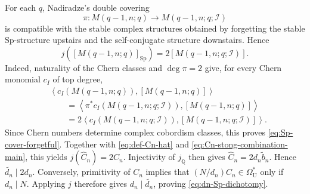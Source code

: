\documentclass[14pt,dvipsnames]{extarticle}
\makeatletter
\numberwithin{equation}{subsection}
\theoremstyle{plain}
\theoremstyle{definition}
\theoremstyle{definition}
\renewenvironment{proof}[1][\proofname]{
 \par\pushQED{\qed}\normalfont
 \topsep6\p@\@plus6\p@\relax
 \trivlist\item[\hskip\labelsep\bfseries\itshape #1\@addpunct{.}]
}{\popQED\endtrivlist\@endpefalse}
\newcommand{\OmU}{\Omega_{\mathrm U}^{\ast}}
\newcommand{\Sp}{\mathrm{Sp}}
\newcommand{\Ii}{\mathcal I}
\newcommand{\Q}{\mathbb{Q}}
\makeatother
\begin{document}
\begin{proof}[Proof of \cref{prop:sp-covering-numerator}]
For each $q$, Nadiradze's double covering \cite{Nad80}
\[
 \pi\colon M(q-1,n;q)\longrightarrow M(q-1,n;q;\Ii)
\]
is compatible with the stable complex structures obtained by forgetting the
stable $\Sp$-structure upstairs and the self-conjugate structure downstairs.
Hence
\begin{equation}\label{eq:Sp-cover-forgetful}
 j([M(q-1,n;q)]_{\Sp})
 =2[M(q-1,n;q;\Ii)].
\end{equation}
Indeed, naturality of the Chern classes and $\deg\pi=2$ give, for every Chern
monomial $c_I$ of top degree,
\[
 \begin{aligned}
 &\left\langle c_I(M(q-1,n;q)),[M(q-1,n;q)]\right\rangle\\
 &\qquad=\left\langle\pi^*c_I(M(q-1,n;q;\Ii)),
                     [M(q-1,n;q)]\right\rangle\\
 &\qquad=2\left\langle c_I(M(q-1,n;q;\Ii)),
                      [M(q-1,n;q;\Ii)]\right\rangle.
 \end{aligned}
\]
Since Chern numbers determine complex cobordism classes, this proves
\eqref{eq:Sp-cover-forgetful}.
Together with \eqref{eq:def-Cn-hat} and
\eqref{eq:Cn-stong-combination-main}, this yields
$j(\widehat C_n)=2C_n$. Injectivity of $j_{\Q}$ then gives
$\widehat C_n=2d_n\widetilde b_n$. Hence
$\widetilde{d_n}\mid2d_n$. Conversely, primitivity of $C_n$ implies that
$(N/d_n)C_n\in\OmU$ only if $d_n\mid N$. Applying $j$ therefore gives
$d_n\mid\widetilde{d_n}$, proving \eqref{eq:dn-Sp-dichotomy}.
\end{proof}
\end{document}
